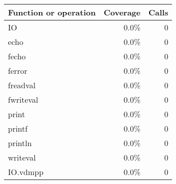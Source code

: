 \documentclass[a4paper]{article}
\begin{document}
\bigskip
\begin{longtable}{|l|r|r|}
\hline
Function or operation & Coverage & Calls \\
\hline
\hline
IO & 0.0\% & 0 \\
\hline
echo & 0.0\% & 0 \\
\hline
fecho & 0.0\% & 0 \\
\hline
ferror & 0.0\% & 0 \\
\hline
freadval & 0.0\% & 0 \\
\hline
fwriteval & 0.0\% & 0 \\
\hline
print & 0.0\% & 0 \\
\hline
printf & 0.0\% & 0 \\
\hline
println & 0.0\% & 0 \\
\hline
writeval & 0.0\% & 0 \\
\hline
\hline
IO.vdmpp & 0.0\% & 0 \\
\hline
\end{longtable}
\end{document}
